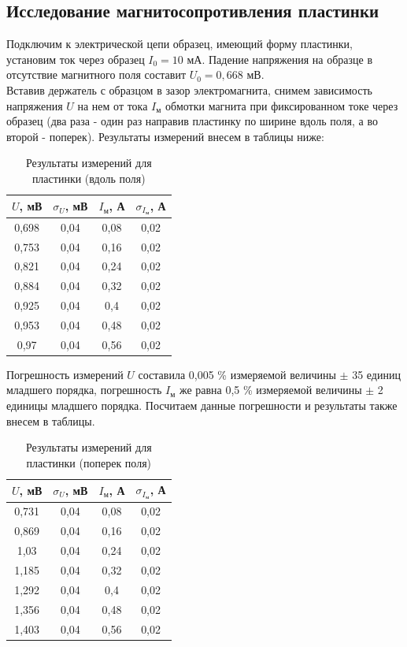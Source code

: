 \documentclass[a4paper,12pt]{extarticle}
\begin{document}
\subsection*{Исследование магнитосопротивления пластинки}
Подключим к электрической цепи образец, имеющий форму пластинки, установим ток через образец $I_0 = 10$ мА. Падение напряжения на образце в отсутствие магнитного поля составит $U_0 = 0,668$ мВ.\\
Вставив держатель с образцом в зазор электромагнита, снимем зависимость напряжения $U$ на нем от тока $I_{\text{м}}$ обмотки магнита при фиксированном токе через образец (два раза - один раз направив пластинку по ширине вдоль поля, а во второй - поперек). Результаты измерений внесем в таблицы ниже:
\begin{table}[H]
\centering
\begin{tabular}{|c|c|c|c|}
\hline
$U$, мВ & $\sigma_{U}$, мВ & $I_{\text{м}}$, А & $\sigma_{I_{\text{м}}}$, А \\ \hline
0,698 & 0,04 & 0,08 & 0,02 \\ \hline
0,753 & 0,04 & 0,16 & 0,02 \\ \hline
0,821 & 0,04 & 0,24 & 0,02 \\ \hline
0,884 & 0,04 & 0,32 & 0,02 \\ \hline
0,925 & 0,04 & 0,4  & 0,02 \\ \hline
0,953 & 0,04 & 0,48 & 0,02 \\ \hline
0,97  & 0,04 & 0,56 & 0,02 \\ \hline
\end{tabular}
\caption{Результаты измерений для пластинки (вдоль поля)}
\end{table}
\noindent Погрешность измерений $U$ составила 0,005 \% измеряемой величины $\pm$ 35 единиц младшего порядка, погрешность $I_{\text{м}}$ же равна 0,5 \% измеряемой величины $\pm$ 2 единицы младшего порядка. Посчитаем данные погрешности и результаты также внесем в таблицы.
\begin{table}[H]
\centering
\begin{tabular}{|c|c|c|c|}
\hline
$U$, мВ & $\sigma_{U}$, мВ & $I_{\text{м}}$, А & $\sigma_{I_{\text{м}}}$, А \\ \hline
0,731 & 0,04 & 0,08 & 0,02 \\ \hline
0,869 & 0,04 & 0,16 & 0,02 \\ \hline
1,03  & 0,04 & 0,24 & 0,02 \\ \hline
1,185 & 0,04 & 0,32 & 0,02 \\ \hline
1,292 & 0,04 & 0,4  & 0,02 \\ \hline
1,356 & 0,04 & 0,48 & 0,02 \\ \hline
1,403 & 0,04 & 0,56 & 0,02 \\ \hline
\end{tabular}
\caption{Результаты измерений для пластинки (поперек поля)}
\end{table}
\end{document}
